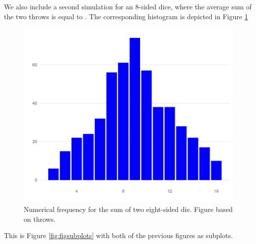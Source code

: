 \documentclass[12pt]{article}
\theoremstyle{definition}
\begin{document}
We also include a second simulation for an 8-sided dice, where the average sum of the two throws is equal to \unskip. The corresponding histogram is depicted in Figure \ref{fig:hist_500_8} 
\begin{figure}[tbh!]
\centering
\includegraphics[width=.8\linewidth]{plot/500_8/hist.png}
\caption[]{Numerical frequency for the sum of two eight-sided die. Figure based on throws.}
\label{fig:hist_500_8}
\end{figure}

\newpage

This is Figure \ref{fig:figsubplots} with both of the previous figures as subplots. 
\end{document}
